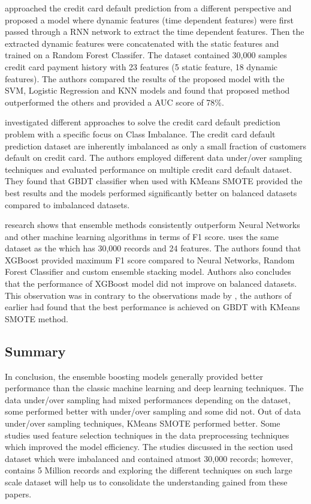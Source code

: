 \documentclass[twoside,11pt,a4paper]{article}
\begin{document}
\citep{hsu2019enhanced} approached the credit card default prediction from a different perspective and proposed a model where dynamic features (time dependent features) were first passed through a \acf{RNN} network to extract the time dependent features. Then the extracted dynamic features were concatenated with the static features and trained on a Random Forest Classifer. The dataset contained 30,000 samples credit card payment history with 23 features (5 static feature, 18 dynamic features). The authors compared the results of the proposed model with the \acs{SVM}, Logistic Regression and KNN models and found that proposed method outperformed the others and provided a \acs{AUC} score of 78\%.

\citep{alam2020investigation} investigated different approaches to solve the credit card default prediction problem with a specific focus on Class Imbalance. The credit card default prediction dataset are inherently imbalanced as only a small fraction of customers default on credit card. The authors employed different data under/over sampling techniques and evaluated performance on multiple credit card default dataset. They found that \acs{GBDT} classifier when used with KMeans \acs{SMOTE} provided the best results and the models performed significantly better on balanced datasets compared to imbalanced datasets.

\citep{faraj2021comparison} research shows that ensemble  methods  consistently  outperform  Neural  Networks  and  other  machine  learning algorithms in terms of F1 score. \citep{faraj2021comparison} uses the same dataset as the \citep{sayjadah2018credit} which has 30,000 records and 24 features. The authors found that \acs{XGBoost} provided maximum F1 score compared to Neural Networks, Random Forest Classifier and custom ensemble stacking model. Authors also concludes that the performance of \acs{XGBoost} model did not improve on balanced datasets. This observation was in contrary to the observations made by \citep{emil2019enhancing}, the authors of earlier had found that the best performance is achieved on \acs{GBDT} with KMeans \acs{SMOTE} method.

\subsection{Summary}
In conclusion, the ensemble boosting models generally provided better performance than the classic machine learning and deep learning techniques. The data under/over sampling had mixed performances depending on the dataset, some performed better with under/over sampling and some did not. Out of data under/over sampling techniques, KMeans \acs{SMOTE} performed better. Some studies used feature selection techniques in the data preprocessing techniques which improved the model efficiency. The studies discussed in the section used dataset which were imbalanced and  contained atmost 30,000 records; however, \citep{amex-default-prediction-dataset} contains 5 Million records and exploring the different techniques on such large scale dataset will help us to consolidate the understanding gained from these papers.
\end{document}
